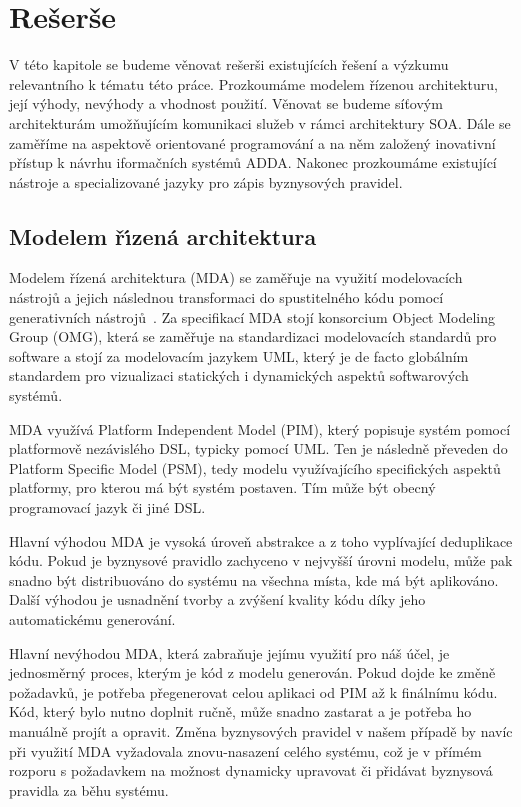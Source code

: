 
\chapter{Rešerše}\label{ch:reserse}

V této kapitole se budeme věnovat rešerši existujících řešení
a výzkumu relevantního k tématu této práce. Prozkoumáme
modelem řízenou architekturu, její výhody, nevýhody a vhodnost
použití. Věnovat se budeme síťovým architekturám umožňujícím
komunikaci služeb v rámci architektury \gls{SOA}.
Dále se zaměříme na aspektově orientované programování
a na něm založený inovativní přístup k návrhu iformačních systémů \gls{ADDA}.
Nakonec prozkoumáme existující nástroje a specializované jazyky pro zápis
byznysových pravidel.

\section{Modelem ř\'{\i}zená architektura}

Modelem řízená architektura (\gls{MDA}) se zaměřuje na využití
modelovacích nástrojů a jejich následnou transformaci do
spustitelného kódu pomocí generativních nástrojů~\cite{soley2000model}.
Za specifikací \gls{MDA} stojí konsorcium Object Modeling Group (\gls{OMG}),
která se zaměřuje na standardizaci modelovacích standardů pro software
a stojí za modelovacím jazykem \gls{UML}, který je de facto globálním standardem
pro vizualizaci statických i dynamických aspektů softwarových systémů.

\gls{MDA} využívá Platform Independent Model (\gls{PIM}),
který popisuje systém pomocí platformově nezávislého \gls{DSL},
typicky pomocí \gls{UML}. Ten je následně převeden do
Platform Specific Model (\gls{PSM}), tedy modelu využívajícího
specifických aspektů platformy, pro kterou má být systém postaven.
Tím může být obecný programovací jazyk či jiné \gls{DSL}.

Hlavní výhodou \gls{MDA} je vysoká úroveň abstrakce a z toho vyplívající
deduplikace kódu. Pokud je byznysové pravidlo zachyceno v nejvyšší
úrovni modelu, může pak snadno být distribuováno do systému na všechna
místa, kde má být aplikováno. Další výhodou je usnadnění tvorby a zvýšení
kvality kódu díky jeho automatickému generování.

Hlavní nevýhodou \gls{MDA}, která zabraňuje jejímu využití
pro náš účel, je jednosměrný proces, kterým je kód z modelu
generován. Pokud dojde ke změně požadavků, je potřeba přegenerovat
celou aplikaci od \gls{PIM} až k finálnímu kódu. Kód, který bylo
nutno doplnit ručně, může snadno zastarat a je potřeba ho manuálně
projít a opravit. Změna byznysových pravidel v našem případě by
navíc při využití \gls{MDA} vyžadovala znovu-nasazení celého
systému, což je v přímém rozporu s požadavkem na možnost dynamicky
upravovat či přidávat byznysová pravidla za běhu systému.

